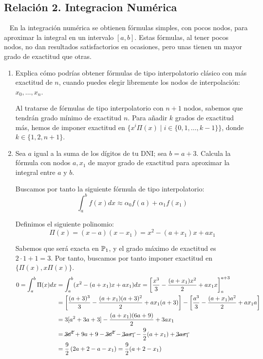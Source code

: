 \subsection{Relación 2. Integracion Numérica}
\setcounter{ejercicio}{0}


\begin{ejercicio}~\label{ej:2.3.1}
    En la integración numérica se obtienen fórmulas simples, con pocos nodos, para aproximar la integral en un intervalo $[a, b]$. Estas fórmulas, al tener pocos nodos, no dan resultados satisfactorios en ocasiones, pero unas tienen un mayor grado de exactitud que otras.
    \begin{enumerate}
        \item Explica cómo podrías obtener fórmulas de tipo interpolatorio clásico con más exactitud de $n$, cuando puedes elegir libremente los nodos de interpolación: $x_0, \ldots, x_n$.
        
        Al tratarse de fórmulas de tipo interpolatorio con $n+1$ nodos, sabemos que tendrán grado mínimo de exactitud $n$. Para añadir $k$ grados de exactitud más, hemos de imponer exactitud en $\{x^i\Pi(x)\mid i\in \{0,1,\ldots,k-1\}\}$, donde $k\in \{1,2,n+1\}$.

        \item Sea $a$ igual a la suma de los dígitos de tu DNI; sea $b = a + 3$. Calcula la fórmula con nodos $a, x_1$ de mayor grado de exactitud para aproximar la integral entre $a$ y $b$.
        
        Buscamos por tanto la siguiente fórmula de tipo interpolatorio:
        \begin{equation*}
            \int_{a}^{b} f(x)dx \approx \alpha_0 f(a) + \alpha_1 f(x_1)
        \end{equation*}

        Definimos el siguiente polinomio:
        \begin{equation*}
            \Pi(x) = (x-a)(x-x_1) = x^2 - (a+x_1)x + ax_1
        \end{equation*}

        Sabemos que será exacta en $\mathbb{P}_1$, y el grado máximo de exactitud es $2\cdot 1+1=3$. Por tanto, buscamos por tanto imponer exactitud en $\{\Pi(x), x\Pi(x)\}$.
        \begin{align*}
            0 = \int_{a}^{b} \Pi(x)dx &= \int_{a}^{b} (x^2 - (a+x_1)x + ax_1)dx = \left[\dfrac{x^3}{3} - \dfrac{(a+x_1)x^2}{2} + ax_1x\right]_{a}^{a+3}\\
            &= \left[\dfrac{(a+3)^3}{3} - \dfrac{(a+x_1)(a+3)^2}{2} + ax_1(a+3)\right] - \left[\dfrac{a^3}{3} - \dfrac{(a+x_1)a^2}{2} + ax_1a\right]\\
            &= 3[a^2+3a+3] - \dfrac{(a+x_1)(6a+9)}{2} + 3ax_1\\
            &= \cancel{3a^2} + 9a + 9 - \cancel{3a^2}-\cancel{3ax_1} - \dfrac{9}{2}(a+x_1) + \cancel{3ax_1}\\
            &= \dfrac{9}{2}\left(2a+2-a-x_1\right) = \dfrac{9}{2}(a+2-x_1)
        \end{align*}


\end{enumerate}
\end{ejercicio}
